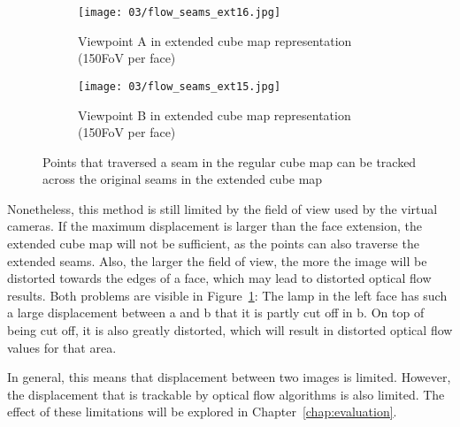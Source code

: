 \begin{figure}
\centering
    \hfill
    \begin{subfigure}[t]{0.5\textwidth}            
            \centering
            \texttt{[image: 03/flow\_seams\_ext16.jpg]}
            \caption{Viewpoint A in extended cube map representation (150\degree FoV per face)}
    \end{subfigure}%
    \hfill
    \begin{subfigure}[t]{0.5\textwidth}
            \centering
            \texttt{[image: 03/flow\_seams\_ext15.jpg]}
            \caption{Viewpoint B in extended cube map representation (150\degree FoV per face)}
    \end{subfigure}
    \hfill
    \hfill
  \caption[Tracking points across seams in the extended cube map]{Points that traversed a seam in the regular cube map can be tracked across the original seams in the extended cube map} \label{fig:flow_seams_ext}
\end{figure}

Nonetheless, this method is still limited by the field of view used by the virtual cameras. If the maximum displacement is larger than the face extension, the extended cube map will not be sufficient, as the points can also traverse the extended seams. Also, the larger the field of view, the more the image will be distorted towards the edges of a face, which may lead to distorted optical flow results. Both problems are visible in Figure~\ref{fig:flow_seams_ext}: The lamp in the left face has such a large displacement between a and b that it is partly cut off in b. On top of being cut off, it is also greatly distorted, which will result in distorted optical flow values for that area.

In general, this means that displacement between two images is limited. However, the displacement that is trackable by optical flow algorithms is also limited. The effect of these limitations will be explored in Chapter~\ref{chap:evaluation}.

